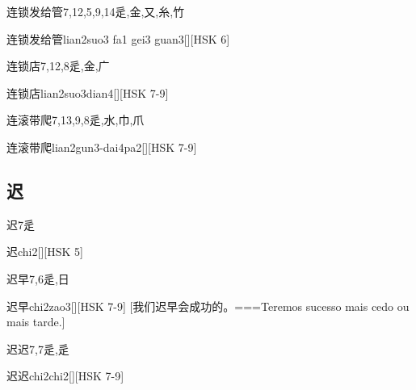 \begin{Entry}{连锁发给管}{7,12,5,9,14}{⾡,⾦,⼜,⽷,⽵}
  \begin{Phonetics}{连锁发给管}{lian2suo3 fa1 gei3 guan3}[][HSK 6]
  \end{Phonetics}
\end{Entry}

\begin{Entry}{连锁店}{7,12,8}{⾡,⾦,⼴}
  \begin{Phonetics}{连锁店}{lian2suo3dian4}[][HSK 7-9]
  \end{Phonetics}
\end{Entry}

\begin{Entry}{连滚带爬}{7,13,9,8}{⾡,⽔,⼱,⽖}
  \begin{Phonetics}{连滚带爬}{lian2gun3-dai4pa2}[][HSK 7-9]
  \end{Phonetics}
\end{Entry}

\subsection*{迟}

\begin{Entry}{迟}{7}{⾡}
  \begin{Phonetics}{迟}{chi2}[][HSK 5]
  \end{Phonetics}
\end{Entry}

\begin{Entry}{迟早}{7,6}{⾡,⽇}
  \begin{Phonetics}{迟早}{chi2zao3}[][HSK 7-9]
    [我们迟早会成功的。===Teremos sucesso mais cedo ou mais tarde.]
  \end{Phonetics}
\end{Entry}

\begin{Entry}{迟迟}{7,7}{⾡,⾡}
  \begin{Phonetics}{迟迟}{chi2chi2}[][HSK 7-9]
  \end{Phonetics}
\end{Entry}

